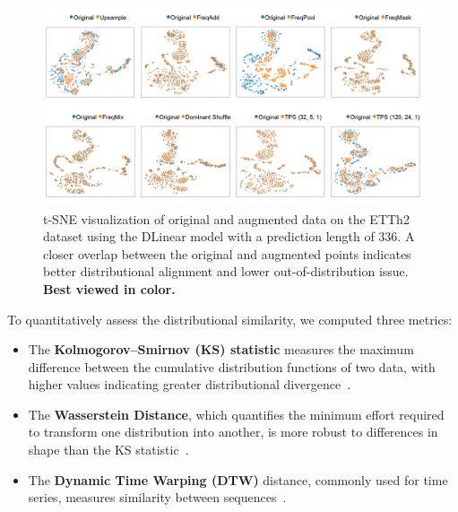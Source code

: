 \begin{figure}[h!]
    \centering
\includegraphics[page=1, width=1.0\textwidth, keepaspectratio]{./images/tsne_result.png}
\caption{t-SNE visualization of original and augmented data on the ETTh2 dataset using the DLinear model with a prediction length of 336.  A closer overlap between the original and augmented points indicates better distributional alignment and lower out-of-distribution issue. \textbf{Best viewed in color.}}
    \label{fig:tsne}
\end{figure}




To quantitatively assess the distributional similarity, we computed three metrics:
\begin{itemize}
    \item The \textbf{Kolmogorov–Smirnov (KS) statistic} measures the maximum difference between the cumulative distribution functions of two data, with higher values indicating greater distributional divergence~\cite{gchron-5-263-2023}.

    \item The \textbf{Wasserstein Distance}, which quantifies the minimum effort required to transform one distribution into another, is more robust to differences in shape than the KS statistic~\cite{gchron-5-263-2023, Iglesias2023}.
    
    \item The \textbf{Dynamic Time Warping (DTW)} distance, commonly used for time series, measures similarity between sequences~\cite{iwana2020timeseriesdataaugmentation, Iglesias2023}.


\end{itemize}

